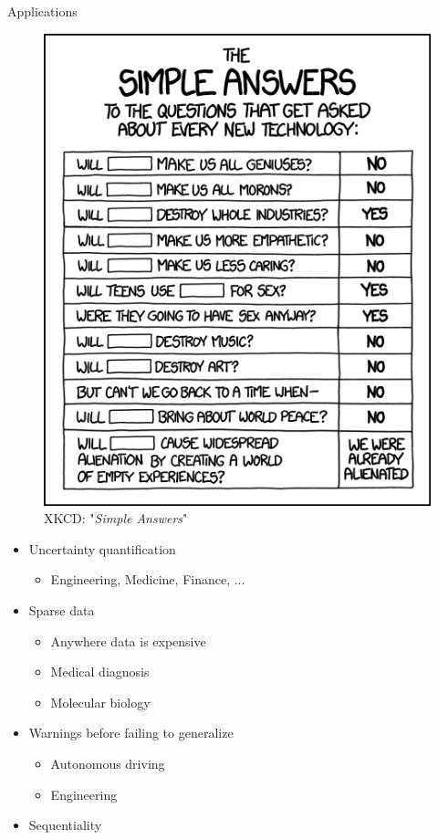 \documentclass{beamer}
\begin{document}
\begin{frame}{Applications}
	\begin{multicols}{2}
		\begin{figure}
			\includegraphics[width=.4\textwidth]{../Images/xkcd_simple_answers.png}
			\caption{XKCD: "\textit{Simple Answers}" \cite{xkcd-simple-answers}}
		\end{figure}
		
		\columnbreak
		
		\null \vfill
		\begin{itemize}
			\item Uncertainty quantification
				\begin{itemize}
					\item Engineering, Medicine, Finance, ...
				\end{itemize}
			\item Sparse data
				\begin{itemize}
					\item Anywhere data is expensive
					\item Medical diagnosis
					\item Molecular biology
				\end{itemize}
			\item Warnings before failing to generalize
				\begin{itemize}
					\item Autonomous driving
					\item Engineering
				\end{itemize}

			\item Sequentiality
		\end{itemize}
		
		\vfill \null
	\end{multicols}
\end{frame}
\end{document}
